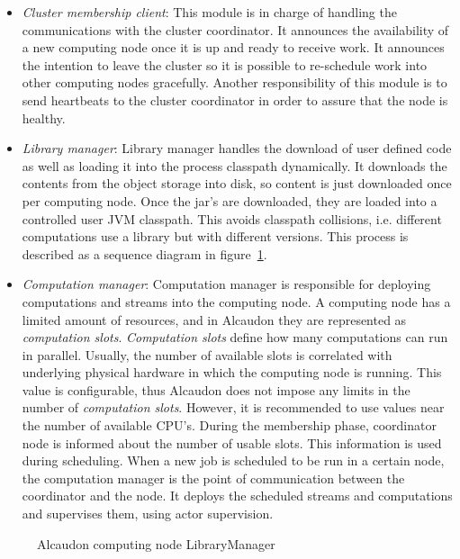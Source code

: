 \begin{itemize}
\item \textit{Cluster membership client}: This module is in charge of handling
  the communications with the cluster coordinator. It announces the availability
  of a new computing node once it is up and ready to receive work. It announces
  the intention to leave the cluster so it is possible to re-schedule work into
  other computing nodes gracefully. Another responsibility of this module is to
  send heartbeats to the cluster coordinator in order to assure that the node is
  healthy.
\item \textit{Library manager}: Library manager handles the download of user
  defined code as well as loading it into the process classpath dynamically.
  It downloads the contents from the object storage into disk, so content is
  just downloaded once per computing node. Once the \acs{jar}'s are downloaded,
  they are loaded into a controlled user \acs{JVM} classpath. This avoids
  classpath collisions, i.e. different computations use a library but with
  different versions. This process is described as a sequence diagram in
  figure~\ref{fig:librarymanagement}.
\item \textit{Computation manager}: Computation manager is responsible for
  deploying computations and streams into the computing node. A computing node
  has a limited amount of resources, and in Alcaudon they are represented as
  \textit{computation slots}. \textit{Computation slots}
  define how many computations can run in parallel. Usually, the number of
  available slots is correlated with underlying physical hardware in which the
  computing node is running. This value is configurable, thus Alcaudon does not
  impose any limits in the number of \textit{computation slots}. However, it
  is recommended to use values near the number of available CPU's. During
  the membership phase, coordinator node is informed about the number
  of usable slots. This information is used during scheduling. When a new
  job is scheduled to be run in a certain node, the computation manager
  is the point of communication between the coordinator and the node.
  It deploys the scheduled streams and computations and supervises them,
  using actor supervision.
\end{itemize}

\begin{figure}[!h]
  \centering
  \scalebox{0.45}{
    
  }
  \caption{Alcaudon computing node LibraryManager}
  \label{fig:librarymanagement}
\end{figure}

